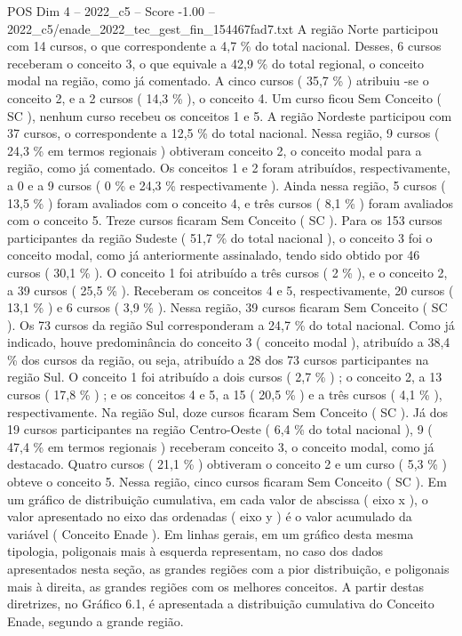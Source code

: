 \begin{textsample}{POS Dim 4 – 2022\_c5 – Score -1.00 – 2022\_c5/enade\_2022\_tec\_gest\_fin\_154467fad7.txt}
A região Norte participou com 14 cursos, o que correspondente a 4,7 \% do total nacional.
Desses, 6 cursos receberam o conceito 3, o que equivale a 42,9 \% do total regional, o conceito modal na região, como já comentado.
A cinco cursos ( 35,7 \% ) atribuiu -se o conceito 2, e a 2 cursos ( 14,3 \% ), o conceito 4.
Um curso ficou Sem Conceito ( SC ), nenhum curso recebeu os conceitos 1 e 5.
A região Nordeste participou com 37 cursos, o correspondente a 12,5 \% do total nacional.
Nessa região, 9 cursos ( 24,3 \% em termos regionais ) obtiveram conceito 2, o conceito modal para a região, como já comentado.
Os conceitos 1 e 2 foram atribuídos, respectivamente, a 0 e a 9 cursos ( 0 \% e 24,3 \% respectivamente ).
Ainda nessa região, 5 cursos ( 13,5 \% ) foram avaliados com o conceito 4, e três cursos ( 8,1 \% ) foram avaliados com o conceito 5.
Treze cursos ficaram Sem Conceito ( SC ).
Para os 153 cursos participantes da região Sudeste ( 51,7 \% do total nacional ), o conceito 3 foi o conceito modal, como já anteriormente assinalado, tendo sido obtido por 46 cursos ( 30,1 \% ).
O conceito 1 foi atribuído a três cursos ( 2 \% ), e o conceito 2, a 39 cursos ( 25,5 \% ).
Receberam os conceitos 4 e 5, respectivamente, 20 cursos ( 13,1 \% ) e 6 cursos ( 3,9 \% ).
Nessa região, 39 cursos ficaram Sem Conceito ( SC ).
Os 73 cursos da região Sul corresponderam a 24,7 \% do total nacional.
Como já indicado, houve predominância do conceito 3 ( conceito modal ), atribuído a 38,4 \% dos cursos da região, ou seja, atribuído a 28 dos 73 cursos participantes na região Sul.
O conceito 1 foi atribuído a dois cursos ( 2,7 \% ) ; o conceito 2, a 13 cursos ( 17,8 \% ) ; e os conceitos 4 e 5, a 15 ( 20,5 \% ) e a três cursos ( 4,1 \% ), respectivamente.
Na região Sul, doze cursos ficaram Sem Conceito ( SC ).
Já dos 19 cursos participantes na região Centro-Oeste ( 6,4 \% do total nacional ), 9 ( 47,4 \% em termos regionais ) receberam conceito 3, o conceito modal, como já destacado.
Quatro cursos ( 21,1 \% ) obtiveram o conceito 2 e um curso ( 5,3 \% ) obteve o conceito 5.
Nessa região, cinco cursos ficaram Sem Conceito ( SC ).
Em um gráfico de distribuição cumulativa, em cada valor de abscissa ( eixo x ), o valor apresentado no eixo das ordenadas ( eixo y ) é o valor acumulado da variável ( Conceito Enade ).
Em linhas gerais, em um gráfico desta mesma tipologia, poligonais mais à esquerda representam, no caso dos dados apresentados nesta seção, as grandes regiões com a pior distribuição, e poligonais mais à direita, as grandes regiões com os melhores conceitos.
A partir destas diretrizes, no Gráfico 6.1, é apresentada a distribuição cumulativa do Conceito Enade, segundo a grande região.

\end{textsample}
